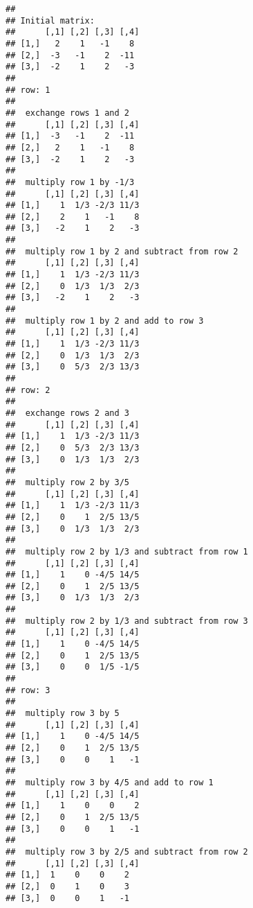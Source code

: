\documentclass[
]{article}
\begin{document}
\begin{verbatim}
## 
## Initial matrix:
##      [,1] [,2] [,3] [,4]
## [1,]   2    1   -1    8 
## [2,]  -3   -1    2  -11 
## [3,]  -2    1    2   -3 
## 
## row: 1 
## 
##  exchange rows 1 and 2 
##      [,1] [,2] [,3] [,4]
## [1,]  -3   -1    2  -11 
## [2,]   2    1   -1    8 
## [3,]  -2    1    2   -3 
## 
##  multiply row 1 by -1/3 
##      [,1] [,2] [,3] [,4]
## [1,]    1  1/3 -2/3 11/3
## [2,]    2    1   -1    8
## [3,]   -2    1    2   -3
## 
##  multiply row 1 by 2 and subtract from row 2 
##      [,1] [,2] [,3] [,4]
## [1,]    1  1/3 -2/3 11/3
## [2,]    0  1/3  1/3  2/3
## [3,]   -2    1    2   -3
## 
##  multiply row 1 by 2 and add to row 3 
##      [,1] [,2] [,3] [,4]
## [1,]    1  1/3 -2/3 11/3
## [2,]    0  1/3  1/3  2/3
## [3,]    0  5/3  2/3 13/3
## 
## row: 2 
## 
##  exchange rows 2 and 3 
##      [,1] [,2] [,3] [,4]
## [1,]    1  1/3 -2/3 11/3
## [2,]    0  5/3  2/3 13/3
## [3,]    0  1/3  1/3  2/3
## 
##  multiply row 2 by 3/5 
##      [,1] [,2] [,3] [,4]
## [1,]    1  1/3 -2/3 11/3
## [2,]    0    1  2/5 13/5
## [3,]    0  1/3  1/3  2/3
## 
##  multiply row 2 by 1/3 and subtract from row 1 
##      [,1] [,2] [,3] [,4]
## [1,]    1    0 -4/5 14/5
## [2,]    0    1  2/5 13/5
## [3,]    0  1/3  1/3  2/3
## 
##  multiply row 2 by 1/3 and subtract from row 3 
##      [,1] [,2] [,3] [,4]
## [1,]    1    0 -4/5 14/5
## [2,]    0    1  2/5 13/5
## [3,]    0    0  1/5 -1/5
## 
## row: 3 
## 
##  multiply row 3 by 5 
##      [,1] [,2] [,3] [,4]
## [1,]    1    0 -4/5 14/5
## [2,]    0    1  2/5 13/5
## [3,]    0    0    1   -1
## 
##  multiply row 3 by 4/5 and add to row 1 
##      [,1] [,2] [,3] [,4]
## [1,]    1    0    0    2
## [2,]    0    1  2/5 13/5
## [3,]    0    0    1   -1
## 
##  multiply row 3 by 2/5 and subtract from row 2 
##      [,1] [,2] [,3] [,4]
## [1,]  1    0    0    2  
## [2,]  0    1    0    3  
## [3,]  0    0    1   -1
\end{verbatim}
\end{document}
